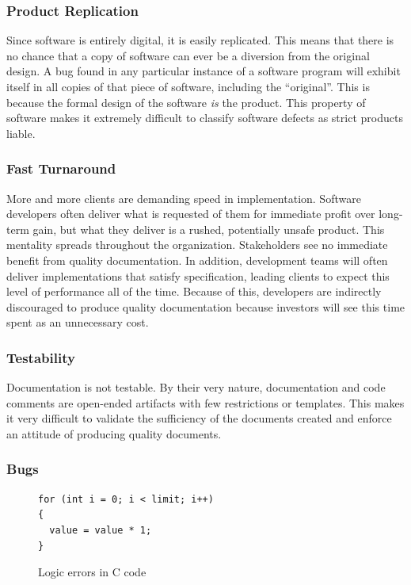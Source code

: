 \subsubsection*{Product Replication}\label{software_product}
Since software is entirely digital, it is easily replicated. This means that
there is no chance that a copy of software can ever be a diversion from the
original design. A bug found in any particular instance of a software program
will exhibit itself in all copies of that piece of software, including the
``original''. This is because the formal design of the software \textit{is} the
product. This property of software makes it extremely difficult to classify
software defects as strict products liable.

\subsubsection*{Fast Turnaround}

More and more clients are demanding speed in implementation. Software developers
often deliver what is requested of them for immediate profit over long-term
gain, but what they deliver is a rushed, potentially unsafe product. This
mentality spreads throughout the organization. Stakeholders see no immediate
benefit from quality documentation. In addition, development teams will often
deliver implementations that satisfy specification, leading clients to expect
this level of performance all of the time. Because of this, developers are
indirectly discouraged to produce quality documentation because investors will
see this time spent as an unnecessary cost.

\subsubsection*{Testability}

Documentation is not testable. By their very nature, documentation and code
comments are open-ended artifacts with few restrictions or templates. This makes
it very difficult to validate the sufficiency of the documents created and
enforce an attitude of producing quality documents.

\subsubsection*{Bugs}

\begin{figure}
\singlespacing
\makebox[\textwidth]{\hrulefill}
\begin{lstlisting}
for (int i = 0; i < limit; i++)
{
  value = value * 1;
}
\end{lstlisting}
\makebox[\textwidth]{\hrulefill}
\doublespacing
\caption{Logic errors in C code}
\label{fig:logic_bug}
\end{figure}

